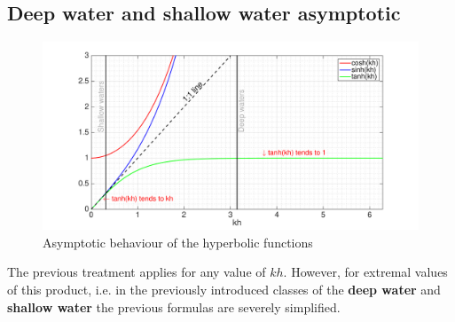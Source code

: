 \subsection{Deep water and shallow water asymptotic}
\begin{figure}
\includegraphics[width=\textwidth]{./SurfWaves_figs/Asymptotics.pdf} 
\caption{Asymptotic behaviour of the hyperbolic functions}\label{asympt}
\end{figure}
The previous treatment applies for any value of $kh$. However, for extremal values of this product, i.e. in the previously introduced classes of the \textbf{deep water} and \textbf{shallow water} the previous formulas are severely simplified. 
